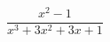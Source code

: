 \hspace*{2mm}\begin{minipage}[t]{\dimexpr\linewidth-2mm\relax}\vspace{0pt}
$\dfrac{x^2-1}{x^3+3x^2+3x+1}$\end{minipage}
